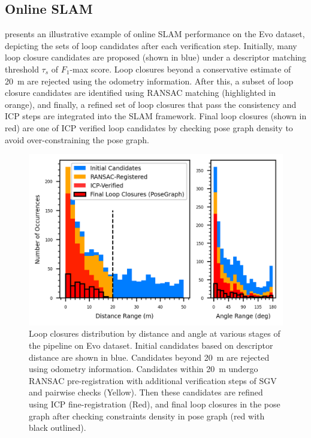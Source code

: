 \subsection{Online SLAM}
 presents an illustrative example of online SLAM performance on the Evo dataset, depicting the sets of loop candidates after each verification step. Initially, many loop closure candidates are proposed (shown in blue) under a descriptor matching threshold $\tau_{s}$ of $F_1$-max score. Loop closures beyond a conservative estimate of \SI{20}{\meter} are rejected using the odometry information. After this, a subset of loop closure candidates are identified using RANSAC matching (highlighted in orange), and finally, a refined set of loop closures that pass the consistency and ICP steps are integrated into the SLAM framework. Final loop closures (shown in red) are one of ICP verified loop candidates by checking pose graph density to avoid over-constraining the pose graph.



\begin{figure}[t]
  \centering
  \includegraphics[width=0.8\columnwidth]{pics/exp_2_2_loop_closure_histograms}
  \caption{Loop closures distribution by distance and angle at various stages of the pipeline on Evo dataset.
   Initial candidates based on descriptor distance are shown in blue. Candidates beyond \SI{20}{\meter} are rejected using odometry information. Candidates within \SI{20}{\meter} undergo RANSAC pre-registration with additional verification steps of SGV\cite{vidanapathirana2023ral} and pairwise checks (Yellow). Then these candidates are refined using ICP fine-registration (Red), and final loop closures in the pose graph after checking constraints density in pose graph (red with black outlined).}
  \label{fig:exp_2_2_loop_closure_histograms}
\end{figure}
